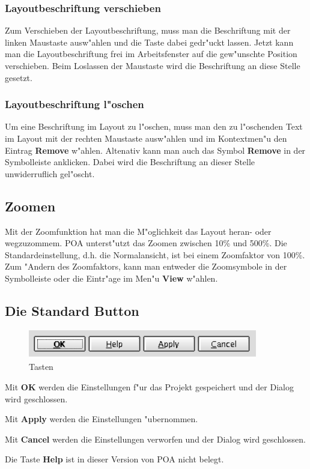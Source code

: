 \documentclass[a4paper,titlepage,12pt,ngerman]{scrbook}
\begin{document}
\subsubsection{Layoutbeschriftung verschieben}
Zum Verschieben der Layoutbeschriftung, muss man die Beschriftung mit der linken Maustaste ausw"ahlen und die Taste dabei gedr"uckt lassen. Jetzt kann man die Layoutbeschriftung frei im Arbeitsfenster auf die gew"unschte Position verschieben. Beim Loslassen der Maustaste wird die Beschriftung an diese Stelle gesetzt.
\subsubsection{Layoutbeschriftung l"oschen}
Um eine Beschriftung im Layout zu l"oschen, muss man den zu l"oschenden Text im Layout mit der rechten Maustaste ausw"ahlen und im Kontextmen"u den Eintrag {\bf Remove} w"ahlen. Altenativ kann man auch das Symbol {\bf Remove} in der Symbolleiste anklicken.
Dabei wird die Beschriftung an dieser Stelle unwiderruflich gel"oscht.


\subsection{Zoomen}
Mit der Zoomfunktion hat man die M"oglichkeit das Layout heran- oder wegzuzommem. POA unterst"utzt das Zoomen zwischen 10{\%} und 500{\%}. Die Standardeinstellung, d.h. die Normalansicht, ist bei einem Zoomfaktor von 100\%.\newline
Zum "Andern des Zoomfaktors, kann man entweder die Zoomsymbole in der Symbolleiste oder die Eintr"age im Men"u {\bf View} w"ahlen.


\subsection{Die Standard Button}
\begin{figure}[htbp]

\begin{center}

\includegraphics[width=10cm]{Button}

\caption{Tasten}\label{test}

\end{center}

\end{figure}
Mit {\bf OK} werden die Einstellungen f"ur das Projekt gespeichert und der Dialog wird geschlossen.\par
Mit {\bf Apply} werden die Einstellungen "ubernommen.\par
Mit {\bf Cancel} werden die Einstellungen verworfen und der Dialog wird geschlossen.\par
Die Taste {\bf Help} ist in dieser Version von POA nicht belegt.
\end{document}
